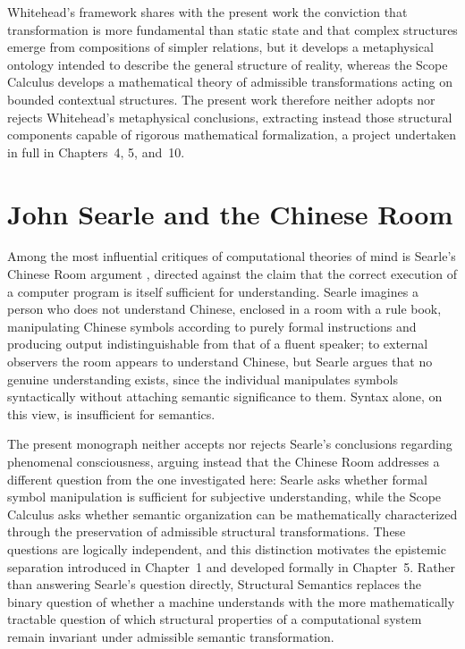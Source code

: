 \documentclass[11pt,twoside,openright]{book}
\numberwithin{equation}{chapter}
\theoremstyle{definition}
\theoremstyle{plain}
\theoremstyle{remark}
\theoremstyle{definition}
\begin{document}
Whitehead's framework shares with the present work the conviction that
transformation is more fundamental than static state and that complex
structures emerge from compositions of simpler relations, but it develops
a metaphysical ontology intended to describe the general structure of
reality, whereas the Scope Calculus develops a mathematical theory of
admissible transformations acting on bounded contextual structures. The
present work therefore neither adopts nor rejects Whitehead's
metaphysical conclusions, extracting instead those structural components
capable of rigorous mathematical formalization, a project undertaken in
full in Chapters~4, 5, and~10.

\section{John Searle and the Chinese Room}

Among the most influential critiques of computational theories of mind is
Searle's Chinese Room argument \cite{Searle1980}, directed against the
claim that the correct execution of a computer program is itself
sufficient for understanding. Searle imagines a person who does not
understand Chinese, enclosed in a room with a rule book, manipulating
Chinese symbols according to purely formal instructions and producing
output indistinguishable from that of a fluent speaker; to external
observers the room appears to understand Chinese, but Searle argues that
no genuine understanding exists, since the individual manipulates symbols
syntactically without attaching semantic significance to them. Syntax
alone, on this view, is insufficient for semantics.

The present monograph neither accepts nor rejects Searle's conclusions
regarding phenomenal consciousness, arguing instead that the Chinese Room
addresses a different question from the one investigated here: Searle
asks whether formal symbol manipulation is sufficient for subjective
understanding, while the Scope Calculus asks whether semantic
organization can be mathematically characterized through the preservation
of admissible structural transformations. These questions are logically
independent, and this distinction motivates the epistemic separation
introduced in Chapter~1 and developed formally in Chapter~5. Rather than
answering Searle's question directly, Structural Semantics replaces the
binary question of whether a machine understands with the more
mathematically tractable question of which structural properties of a
computational system remain invariant under admissible semantic
transformation.
\end{document}
